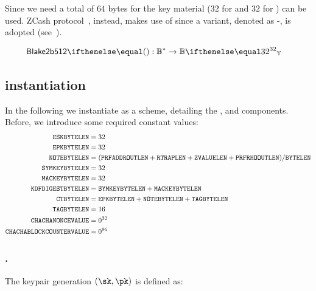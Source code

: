 Since we need a total of $64$ bytes for the key material ($32$ for  and $32$ for )  can be used. ZCash protocol~\cite[Section 5.4.3]{zcashprotocol}, instead, makes use of  since a \dhaes{} variant, denoted as -, is adopted (see~\cite[Section 2.8]{langley2018chacha20}).

\begin{align*}
    \blake{2b512}{}&: \BB^{*} \to \BBy{32}
\end{align*}

\subsection{\encscheme{} instantiation}\label{instantiation:enc:enc-sch}

In the following we instantiate \encscheme{} as a \dhaes{} scheme, detailing the \kgen{}, \enc{} and \dec{} components. Before, we introduce some required constant values:
\begin{align*}
    \mathtt{ESKBYTELEN} &= 32\\
    \mathtt{EPKBYTELEN} &= 32\\
    \mathtt{NOTEBYTELEN} &= (\mathtt{PRFADDROUTLEN} + \mathtt{RTRAPLEN} + \mathtt{ZVALUELEN} + \mathtt{PRFRHOOUTLEN}) / \mathtt{BYTELEN}\\
    \mathtt{SYMKEYBYTELEN} &= 32\\
    \mathtt{MACKEYBYTELEN} &= 32\\
    \mathtt{KDFDIGESTBYTELEN} &= \mathtt{SYMKEYBYTELEN} + \mathtt{MACKEYBYTELEN}\\
    \mathtt{CTBYTELEN} &= \mathtt{EPKBYTELEN} + \mathtt{NOTEBYTELEN} + \mathtt{TAGBYTELEN}\\
    \mathtt{TAGBYTELEN} &= 16\\
    \mathtt{CHACHANONCEVALUE} &= 0^{32}\\
    \mathtt{CHACHABLOCKCOUNTERVALUE} &= 0^{96}\\
\end{align*}

\subsubsection{\encscheme.\kgen{}}

The keypair generation $(\sk, \pk)$ is defined as:

